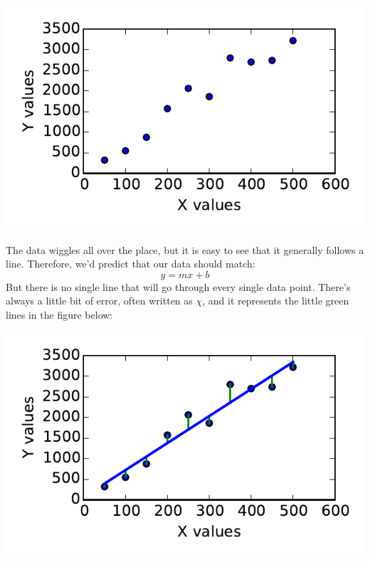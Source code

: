 \documentclass{book}
\begin{document}
\begin{center}
\includegraphics{Lab4_figs/dataScatter.pdf}
\end{center}

The data wiggles all over the place, but it is easy to see that it generally follows a line.  Therefore, we'd predict that our data should match:
\[y=mx+b\]
But there is no single line that will go through every single data point.  There's always a little bit of error, often written as $\chi$, and it represents the little green lines in the figure below:
\begin{center}
\includegraphics{Lab4_figs/dataWfit.pdf}
\end{center}
\end{document}
